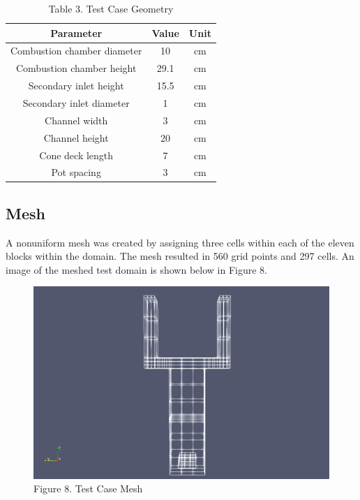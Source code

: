 \documentclass[3p,times,twocolumn]{elsarticle}
\begin{document}
\begin{table}{\linewidth}
	\centering
	\begin{tabular}{||c c c||}
		\hline
		Parameter & Value & Unit \\ [0.4ex]
		\hline\hline
		Combustion chamber diameter & 10 & cm \\
		Combustion chamber height & 29.1 & cm \\
		Secondary inlet height & 15.5 & cm \\
		Secondary inlet diameter & 1 & cm \\
		Channel width & 3 & cm \\
		Channel height & 20 & cm \\
		Cone deck length & 7 & cm \\
		Pot spacing & 3 & cm \\
		\hline
	\end{tabular}
	\newline
	\newline
	\caption{Table 3. Test Case Geometry}
\end{table}


\subsection{Mesh}
A nonuniform mesh was created by assigning three cells within each of the eleven blocks within the domain. The mesh resulted in 560 grid points and 297 cells. An image of the meshed test domain is shown below in Figure 8.
\newline
\begin{figure}{\linewidth}
	\includegraphics[width=\linewidth]{mesh.PNG}
	\caption{Figure 8. Test Case Mesh}
\end{figure}
\end{document}
